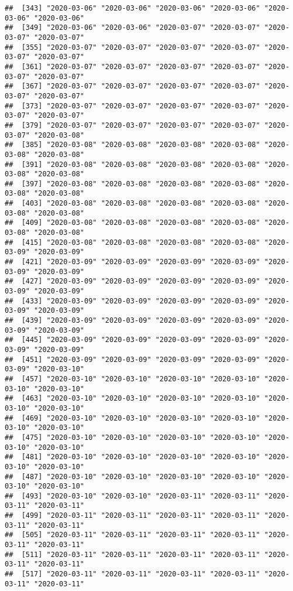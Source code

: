 \documentclass{article}\usepackage[]{graphicx}\usepackage[]{xcolor}
\makeatletter
\newenvironment{kframe}{%
 \def\at@end@of@kframe{}%
 \ifinner\ifhmode%
  \def\at@end@of@kframe{\end{minipage}}%
  \begin{minipage}{\columnwidth}%
 \fi\fi%
 \def\FrameCommand##1{\hskip\@totalleftmargin \hskip-\fboxsep
 \colorbox{shadecolor}{##1}\hskip-\fboxsep
     \hskip-\linewidth \hskip-\@totalleftmargin \hskip\columnwidth}%
 \MakeFramed {\advance\hsize-\width
   \@totalleftmargin\z@ \linewidth\hsize
   \@setminipage}}%
 {\par\unskip\endMakeFramed%
 \at@end@of@kframe}
\newenvironment{knitrout}{}{} %
\makeatother
\begin{document}
\begin{knitrout}
\begin{kframe}
\begin{verbatim}
##  [343] "2020-03-06" "2020-03-06" "2020-03-06" "2020-03-06" "2020-03-06" "2020-03-06"
##  [349] "2020-03-06" "2020-03-06" "2020-03-07" "2020-03-07" "2020-03-07" "2020-03-07"
##  [355] "2020-03-07" "2020-03-07" "2020-03-07" "2020-03-07" "2020-03-07" "2020-03-07"
##  [361] "2020-03-07" "2020-03-07" "2020-03-07" "2020-03-07" "2020-03-07" "2020-03-07"
##  [367] "2020-03-07" "2020-03-07" "2020-03-07" "2020-03-07" "2020-03-07" "2020-03-07"
##  [373] "2020-03-07" "2020-03-07" "2020-03-07" "2020-03-07" "2020-03-07" "2020-03-07"
##  [379] "2020-03-07" "2020-03-07" "2020-03-07" "2020-03-07" "2020-03-07" "2020-03-08"
##  [385] "2020-03-08" "2020-03-08" "2020-03-08" "2020-03-08" "2020-03-08" "2020-03-08"
##  [391] "2020-03-08" "2020-03-08" "2020-03-08" "2020-03-08" "2020-03-08" "2020-03-08"
##  [397] "2020-03-08" "2020-03-08" "2020-03-08" "2020-03-08" "2020-03-08" "2020-03-08"
##  [403] "2020-03-08" "2020-03-08" "2020-03-08" "2020-03-08" "2020-03-08" "2020-03-08"
##  [409] "2020-03-08" "2020-03-08" "2020-03-08" "2020-03-08" "2020-03-08" "2020-03-08"
##  [415] "2020-03-08" "2020-03-08" "2020-03-08" "2020-03-08" "2020-03-09" "2020-03-09"
##  [421] "2020-03-09" "2020-03-09" "2020-03-09" "2020-03-09" "2020-03-09" "2020-03-09"
##  [427] "2020-03-09" "2020-03-09" "2020-03-09" "2020-03-09" "2020-03-09" "2020-03-09"
##  [433] "2020-03-09" "2020-03-09" "2020-03-09" "2020-03-09" "2020-03-09" "2020-03-09"
##  [439] "2020-03-09" "2020-03-09" "2020-03-09" "2020-03-09" "2020-03-09" "2020-03-09"
##  [445] "2020-03-09" "2020-03-09" "2020-03-09" "2020-03-09" "2020-03-09" "2020-03-09"
##  [451] "2020-03-09" "2020-03-09" "2020-03-09" "2020-03-09" "2020-03-09" "2020-03-10"
##  [457] "2020-03-10" "2020-03-10" "2020-03-10" "2020-03-10" "2020-03-10" "2020-03-10"
##  [463] "2020-03-10" "2020-03-10" "2020-03-10" "2020-03-10" "2020-03-10" "2020-03-10"
##  [469] "2020-03-10" "2020-03-10" "2020-03-10" "2020-03-10" "2020-03-10" "2020-03-10"
##  [475] "2020-03-10" "2020-03-10" "2020-03-10" "2020-03-10" "2020-03-10" "2020-03-10"
##  [481] "2020-03-10" "2020-03-10" "2020-03-10" "2020-03-10" "2020-03-10" "2020-03-10"
##  [487] "2020-03-10" "2020-03-10" "2020-03-10" "2020-03-10" "2020-03-10" "2020-03-10"
##  [493] "2020-03-10" "2020-03-10" "2020-03-11" "2020-03-11" "2020-03-11" "2020-03-11"
##  [499] "2020-03-11" "2020-03-11" "2020-03-11" "2020-03-11" "2020-03-11" "2020-03-11"
##  [505] "2020-03-11" "2020-03-11" "2020-03-11" "2020-03-11" "2020-03-11" "2020-03-11"
##  [511] "2020-03-11" "2020-03-11" "2020-03-11" "2020-03-11" "2020-03-11" "2020-03-11"
##  [517] "2020-03-11" "2020-03-11" "2020-03-11" "2020-03-11" "2020-03-11" "2020-03-11"

\end{verbatim}
\end{kframe}
\end{knitrout}
\end{document}
